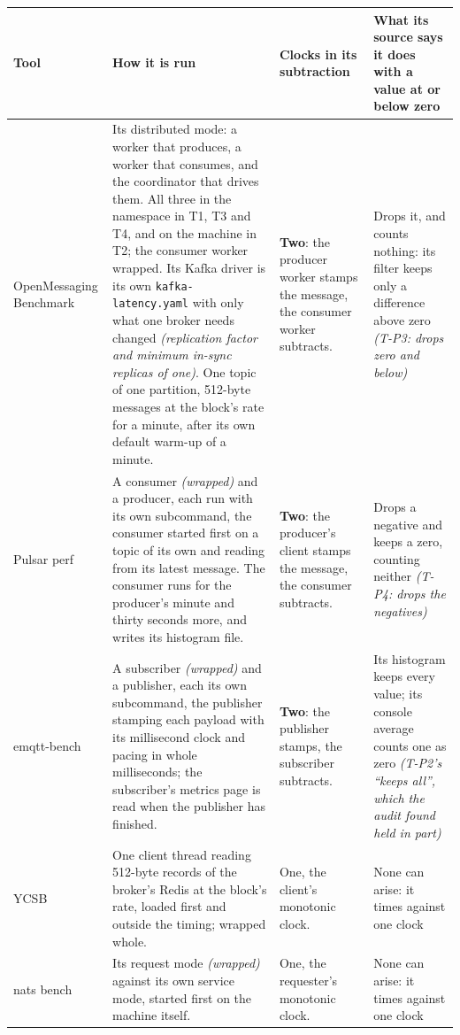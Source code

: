 \documentclass[11pt]{article}
\newcommand{\gl}[1]{{\color{soft}\itshape\small (#1)}}
\begin{document}
{\small
\begin{longtable}{@{}>{\raggedright\arraybackslash}p{2.6cm} >{\raggedright\arraybackslash}p{5.2cm} >{\raggedright\arraybackslash}p{3.2cm} >{\raggedright\arraybackslash}p{4.4cm}@{}}
\toprule
\textbf{Tool} & \textbf{How it is run} & \textbf{Clocks in its subtraction} & \textbf{What its source says it does with a value at or below zero} \\
\midrule
\endhead
OpenMessaging Benchmark & Its distributed mode: a worker that produces, a worker that consumes, and the coordinator that drives them. All three in the namespace in T1, T3 and T4, and on the machine in T2; the consumer worker wrapped. Its Kafka driver is its own \texttt{kafka-latency.yaml} with only what one broker needs changed \gl{replication factor and minimum in-sync replicas of one}. One topic of one partition, 512-byte messages at the block's rate for a minute, after its own default warm-up of a minute. & \textbf{Two}: the producer worker stamps the message, the consumer worker subtracts. & Drops it, and counts nothing: its filter keeps only a difference above zero \gl{T-P3: drops zero and below} \\
Pulsar perf & A consumer \gl{wrapped} and a producer, each run with its own subcommand, the consumer started first on a topic of its own and reading from its latest message. The consumer runs for the producer's minute and thirty seconds more, and writes its histogram file. & \textbf{Two}: the producer's client stamps the message, the consumer subtracts. & Drops a negative and keeps a zero, counting neither \gl{T-P4: drops the negatives} \\
emqtt-bench & A subscriber \gl{wrapped} and a publisher, each its own subcommand, the publisher stamping each payload with its millisecond clock and pacing in whole milliseconds; the subscriber's metrics page is read when the publisher has finished. & \textbf{Two}: the publisher stamps, the subscriber subtracts. & Its histogram keeps every value; its console average counts one as zero \gl{T-P2's ``keeps all'', which the audit found held in part} \\
YCSB & One client thread reading 512-byte records of the broker's Redis at the block's rate, loaded first and outside the timing; wrapped whole. & One, the client's monotonic clock. & None can arise: it times against one clock \\
nats bench & Its request mode \gl{wrapped} against its own service mode, started first on the machine itself. & One, the requester's monotonic clock. & None can arise: it times against one clock \\
\bottomrule
\end{longtable}}
\end{document}
